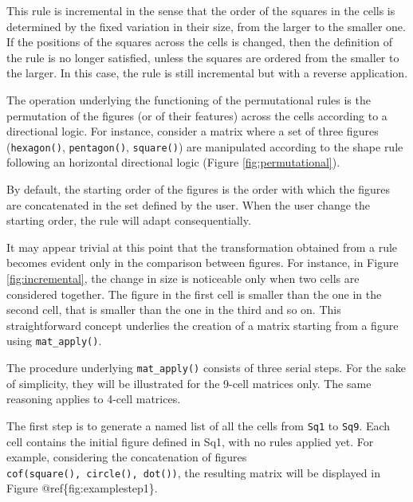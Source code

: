 This rule is incremental in the sense that the order of the squares in the cells is determined by the fixed variation in their size, from the larger to the smaller one.
If the positions of the squares across the cells is changed, then the definition of the rule is no longer satisfied, unless the squares are ordered from the smaller to the larger.
In this case, the rule is still incremental but with a reverse application.

The operation underlying the functioning of the permutational rules is the permutation of the figures (or of their features) across the cells according to a directional logic.
For instance, consider a matrix where a set of three figures (\texttt{hexagon()}, \texttt{pentagon()}, \texttt{square()}) are manipulated according to the shape rule following an horizontal directional logic (Figure \ref{fig:permutational}).


By default, the starting order of the figures is the order with which the figures are concatenated in the set defined by the user.
When the user change the starting order, the rule will adapt consequentially.

It may appear trivial at this point that the transformation obtained from a rule becomes evident only in the comparison between figures.
For instance, in Figure \ref{fig:incremental}, the change in size is noticeable only when two cells are considered together.
The figure in the first cell is smaller than the one in the second cell, that is smaller than the one in the third and so on.
This straightforward concept underlies the creation of a matrix starting from a figure using \texttt{mat\_apply()}.

The procedure underlying \texttt{mat\_apply()} consists of three serial steps.
For the sake of simplicity, they will be illustrated for the 9-cell matrices only.
The same reasoning applies to 4-cell matrices.

The first step is to generate a named list of all the cells from \texttt{Sq1} to \texttt{Sq9}.
Each cell contains the initial figure defined in Sq1, with no rules applied yet.
For example, considering the concatenation of figures \texttt{cof(square(),\ circle(),\ dot())}, the resulting matrix will be displayed in Figure @ref\{fig:examplestep1\}.

